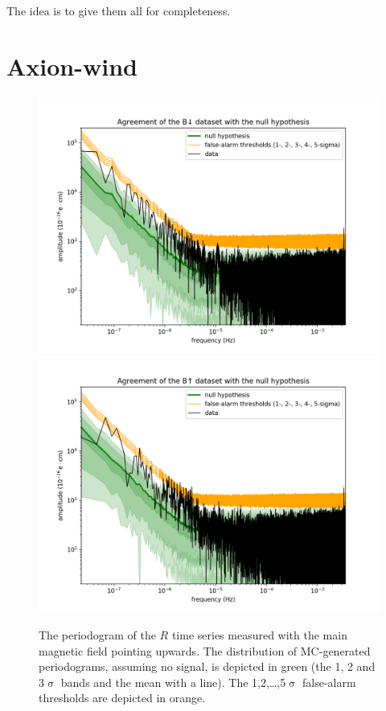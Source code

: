 The idea is to give them all for completeness.


\section{Axion-wind}
\begin{figure}
  \centering
  \includegraphics[width=0.9\linewidth]{gfx/axions/winddeltah4mm_Bdown_detection.png}
  \includegraphics[width=0.9\linewidth]{gfx/axions/winddeltah4mm_Bup_detection.png}
  \caption{The periodogram of the $R$ time series measured with the main magnetic field pointing upwards. The distribution of MC-generated periodograms, assuming no signal, is depicted in green (the 1, 2 and 3$\upsigma$ bands and the mean with a line). The 1,2,…,5$\upsigma$ false-alarm thresholds are depicted in orange.}\label{fig:axions_wind_detection}
\end{figure}



